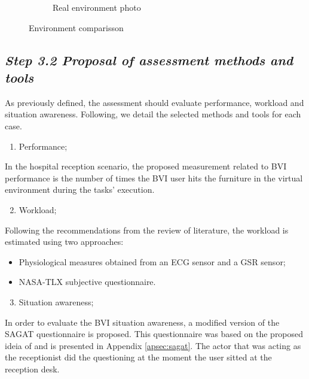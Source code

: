 \begin{figure}[!htb]
\begin{subfigure}[b]{0.49\textwidth}
                \caption{Real environment photo}
                \label{fig:re_photo}
            \end{subfigure}
               \caption{Environment comparisson}
               \label{fig:ve_re}
        \end{figure}

    \subsection*{\textit{Step 3.2 Proposal of assessment methods and tools}}

        As previously defined, the assessment should evaluate performance, workload and situation awareness. Following, we detail the selected methods and tools for each case.

        \begin{enumerate} [label = \Alph*)]
            \item Performance;
        \end{enumerate}
            
        In the hospital reception scenario, the proposed measurement related to BVI performance is the number of times the BVI user hits the furniture in the virtual environment during the tasks’ execution.

        \begin{enumerate} [label = \Alph*)]
            \setcounter{enumi}{1}
            \item Workload;
        \end{enumerate}

        Following the recommendations from the review of literature, the workload is estimated using two approaches:
        \begin{itemize}
            \item Physiological measures obtained from an ECG sensor and a GSR sensor;
            \item NASA-TLX subjective questionnaire.           
        \end{itemize}

        \begin{enumerate} [label = \Alph*)]
            \setcounter{enumi}{2}
            \item Situation awareness;
        \end{enumerate}

        In order to evaluate the BVI situation awareness, a modified version of the SAGAT questionnaire is proposed. This questionnaire was based on the proposed ideia of  and is presented in Appendix \ref{apsec:sagat}. The actor that was acting as the receptionist did the questioning at the moment the user sitted at the reception desk.

